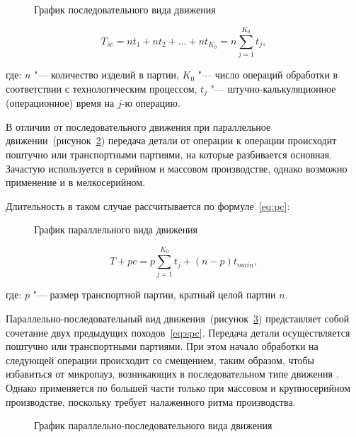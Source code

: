 \begin{figure}[!htb]
	\caption{График последовательного вида движения}\label{fig:seq}
\end{figure}

\begin{equation}
T_{sc} = n t_{1} + n t_{2} + \ldots + n t_{K_0} = n \sum_{j=1}^{K_{0}}t_{j},
\label{eq:sc}
\end{equation}


\noindent где: $n$ "--- количество изделий в партии, $K_{0}$ "--- число операций обработки в соответствии с технологическим процессом,  $t_{j}$ "--- штучно-калькуляционное (операционное) время на $j$-ю операцию.

В отличии от последовательного движения при параллельное движении~(рисунок~\cref{fig:parallel}) передача детали от операции к операции происходит поштучно или транспортными партиями, на которые разбивается основная. Зачастую используется в серийном и массовом производстве, однако возможно применение и в мелкосерийном.

Длительность в таком случае рассчитывается по формуле~\cref{eq:pc}:

\begin{figure}[!htb]
	\caption{График параллельного вида движения}\label{fig:parallel}
\end{figure}

\begin{equation}
T+{pc} = p\sum_{j=1}^{K_{0}}t_{j}+(n-p)t_{main},
\label{eq:pc}
\end{equation}

\noindent где: $p$ "--- размер транспортной партии, кратный целой партии $n$.

Параллельно-последовательный вид движения~(рисунок~\cref{fig:seq-parallel}) представляет собой сочетание двух предыдущих походов~\cref{eq:spc}. Передача детали осуществляется поштучно или транспортными партиями. При этом начало обработки на следующей операции происходит со смещением, таким образом, чтобы избавиться от микропауз, возникающих в последовательном типе движения . Однако применяется по большей части только при массовом и крупносерийном производстве, поскольку требует налаженного ритма производства.

\begin{figure}[!htb]
	\caption{График параллельно-последовательного вида движения}\label{fig:seq-parallel}
\end{figure}

